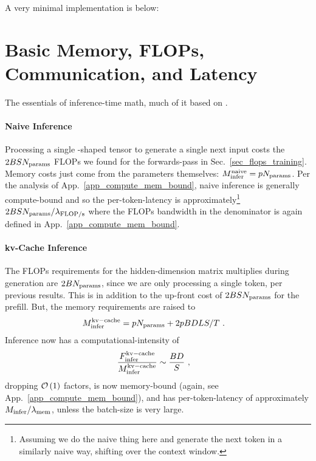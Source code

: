 \documentclass[11pt]{article}
\begin{document}
A very minimal implementation is below:


\section{Basic Memory, FLOPs, Communication, and Latency}

The essentials of inference-time math, much of it based on \cite{kipply_inference_math}.

\paragraph{Naive Inference} Processing a single -shaped tensor to generate a single
next input costs the $ 2BSN _{ {\rm params}  } $ FLOPs we found for the forwards-pass in
Sec.~\ref{sec_flops_training}. Memory costs just come from the parameters themselves: $ M _{ {\rm
infer}  }^{ {\rm naive}  }=pN _{ {\rm params}  } $. Per the analysis of App.~\ref{app_compute_mem_bound},
naive inference is generally compute-bound and so the per-token-latency is approximately\footnote{Assuming we
do the naive thing here and generate the next token in a similarly naive way, shifting over the
context window.}  $  2BSN _{ {\rm params}  }/ \lambda _{ {\rm FLOP/s}  } $ where the FLOPs bandwidth
in the denominator is again defined in App.~\ref{app_compute_mem_bound}.

\paragraph{kv-Cache Inference}
The FLOPs requirements for the hidden-dimension matrix multiplies during generation are $2BN _{ {\rm params}  } $,
since we are only processing a single token, per previous results.   This is in addition to the up-front cost of $ 2BSN _{
{\rm params}} $ for the prefill. But, the memory requirements are raised to
\begin{align}
    M _{ {\rm infer}  }^{ {\rm kv-cache}  } &=pN _{ {\rm params}  } + 2pBDLS/T\ .
\end{align}
Inference now has a computational-intensity of
\begin{align}
    \frac{ F _{ {\rm infer} } ^{ {\rm kv-cache} } }{ M _{ {\rm infer}  }^{ {\rm kv-cache}  } } & \sim \frac{ BD }{ S } \ ,
\end{align}
dropping $ \mathcal{O} \left( 1 \right)  $ factors, is now memory-bound (again, see
App.~\ref{app_compute_mem_bound}), and has per-token-latency of approximately $ M _{ {\rm infer} }/
\lambda _{ {\rm mem} }$, unless the batch-size is very large.
\end{document}
